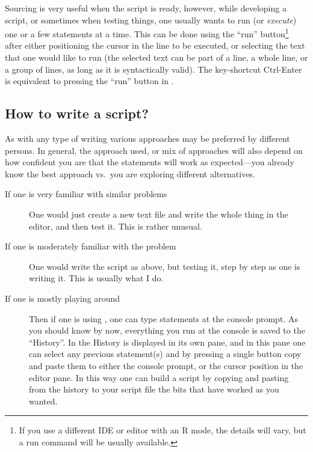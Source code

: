\documentclass[krantz2]{krantz}\usepackage{knitr}%
\begin{document}
Sourcing is very useful when the script is ready, however, while developing a script, or sometimes when testing things, one usually wants to run (or \emph{execute}) one or a few statements at a time. This can be done using the ``run'' button\footnote{If you use a different IDE or editor with an R mode, the details will vary, but a run command will be usually available.} after either positioning the cursor in the line to be executed, or selecting the text that one would like to run (the selected text can be part of a line, a whole line, or a group of lines, as long as it is syntactically valid). The key-shortcut Ctrl-Enter is equivalent to pressing the ``run'' button in \RStudio.

\subsection{How to write a script?}\label{sec:script:writing}

As with any type of writing various approaches may be preferred by different persons. In general, the approach used, or mix of approaches will also depend on how confident you are that the statements will work as expected---you already know the best approach vs.\ you are exploring different alternatives.
\begin{description}
\item[If one is very familiar with similar problems] One would just create a new text file and write the whole thing in the editor, and then test it. This is rather unusual.
\item[If one is moderately familiar with the problem] One would write the script as above, but testing it, step by step as one is writing it. This is usually what I do.
\item[If one is mostly playing around] Then if one is using \RStudio, one can type statements at the console prompt. As you should know by now, everything you run at the console is saved to the ``History''. In \RStudio the History is displayed in its own pane, and in this pane one can select any previous statement(s) and by pressing a single button copy and paste them to either the \Rlang console prompt, or the cursor position in the editor pane. In this way one can build a script by copying and pasting from the history to your script file the bits that have worked as you wanted.
\end{description}
\end{document}
